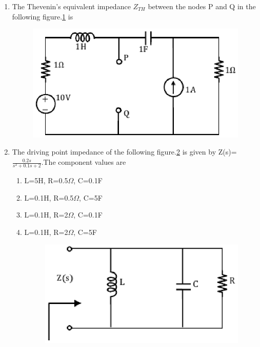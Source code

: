 \documentclass[journal,12pt,twocolumn]{IEEEtran}
\begin{document}
\begin{enumerate}
\item  The Thevenin’s equivalent impedance $Z_{TH}$ between the nodes P and Q in the following figure.\ref{fig70} is
\begin{enumerate}
\setlength\itemsep{2em}
\begin{figure}[!h]
\begin{center}
\includegraphics[scale=0.7]{./figs/fig70.eps}
\caption{}
\label{fig70}
\end{center}
\end{figure}
\end{enumerate}

\item The driving point impedance of the following figure.\ref{fig71} is given by Z(s)=$\frac{0.2s}{s^{2}+0.1s+2}$.The component values are
\begin{enumerate}
\setlength\itemsep{2em}
\item L=5H, R=0.5$\Omega$, C=0.1F
\item L=0.1H, R=0.5$\Omega$, C=5F
\item L=0.1H, R=2$\Omega$, C=0.1F
\item L=0.1H, R=2$\Omega$, C=5F
\begin{figure}[!h]
\begin{center}
\includegraphics[scale=0.5]{./figs/fig71.eps}
\caption{}
\label{fig71}
\end{center}
\end{figure}
\end{enumerate}


\end{enumerate}
\end{document}
